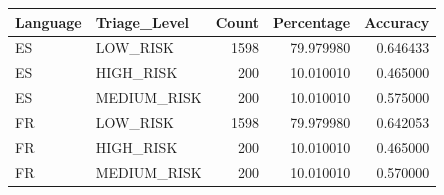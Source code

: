\begin{tabular}{llrrr}
\toprule
Language & Triage_Level & Count & Percentage & Accuracy \\
\midrule
ES & LOW_RISK & 1598 & 79.979980 & 0.646433 \\
ES & HIGH_RISK & 200 & 10.010010 & 0.465000 \\
ES & MEDIUM_RISK & 200 & 10.010010 & 0.575000 \\
FR & LOW_RISK & 1598 & 79.979980 & 0.642053 \\
FR & HIGH_RISK & 200 & 10.010010 & 0.465000 \\
FR & MEDIUM_RISK & 200 & 10.010010 & 0.570000 \\
\bottomrule
\end{tabular}
